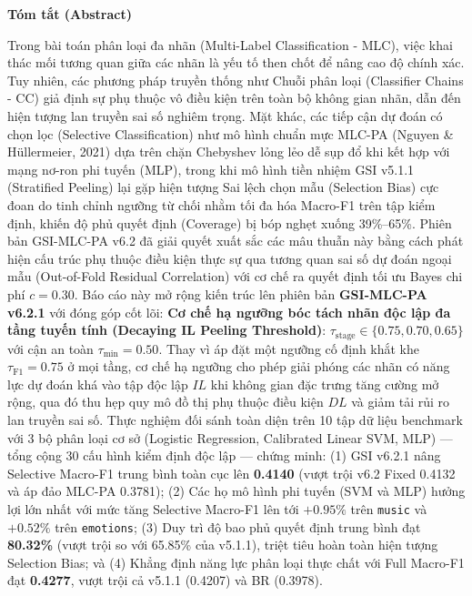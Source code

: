 \documentclass[10pt,a4paper,twoside]{article}
\begin{document}
\begin{center}\textbf{Tóm tắt (Abstract)}\end{center}
Trong bài toán phân loại đa nhãn (Multi-Label Classification - MLC), việc khai thác mối tương quan giữa các nhãn là yếu tố then chốt để nâng cao độ chính xác. Tuy nhiên, các phương pháp truyền thống như Chuỗi phân loại (Classifier Chains - CC) giả định sự phụ thuộc vô điều kiện trên toàn bộ không gian nhãn, dẫn đến hiện tượng lan truyền sai số nghiêm trọng. Mặt khác, các tiếp cận dự đoán có chọn lọc (Selective Classification) như mô hình chuẩn mực MLC-PA (Nguyen \& Hüllermeier, 2021) dựa trên chặn Chebyshev lỏng lẻo dễ sụp đổ khi kết hợp với mạng nơ-ron phi tuyến (MLP), trong khi mô hình tiền nhiệm GSI v5.1.1 (Stratified Peeling) lại gặp hiện tượng Sai lệch chọn mẫu (Selection Bias) cực đoan do tinh chỉnh ngưỡng từ chối nhằm tối đa hóa Macro-F1 trên tập kiểm định, khiến độ phủ quyết định (Coverage) bị bóp nghẹt xuống 39\%--65\%. Phiên bản GSI-MLC-PA v6.2 đã giải quyết xuất sắc các mâu thuẫn này bằng cách phát hiện cấu trúc phụ thuộc điều kiện thực sự qua tương quan sai số dự đoán ngoại mẫu (Out-of-Fold Residual Correlation) với cơ chế ra quyết định tối ưu Bayes chi phí $c = 0.30$. Báo cáo này mở rộng kiến trúc lên phiên bản \textbf{GSI-MLC-PA v6.2.1} với đóng góp cốt lõi: \textbf{Cơ chế hạ ngưỡng bóc tách nhãn độc lập đa tầng tuyến tính (Decaying IL Peeling Threshold)}: $\tau_{\text{stage}} \in \{0.75, 0.70, 0.65\}$ với cận an toàn $\tau_{\min} = 0.50$. Thay vì áp đặt một ngưỡng cố định khắt khe $\tau_{\text{F1}} = 0.75$ ở mọi tầng, cơ chế hạ ngưỡng cho phép giải phóng các nhãn có năng lực dự đoán khá vào tập độc lập $IL$ khi không gian đặc trưng tăng cường mở rộng, qua đó thu hẹp quy mô đồ thị phụ thuộc điều kiện $DL$ và giảm tải rủi ro lan truyền sai số. Thực nghiệm đối sánh toàn diện trên 10 tập dữ liệu benchmark với 3 bộ phân loại cơ sở (Logistic Regression, Calibrated Linear SVM, MLP) --- tổng cộng 30 cấu hình kiểm định độc lập --- chứng minh: (1) GSI v6.2.1 nâng Selective Macro-F1 trung bình toàn cục lên \textbf{0.4140} (vượt trội v6.2 Fixed 0.4132 và áp đảo MLC-PA 0.3781); (2) Các họ mô hình phi tuyến (SVM và MLP) hưởng lợi lớn nhất với mức tăng Selective Macro-F1 lên tới $+0.95\%$ trên \texttt{music} và $+0.52\%$ trên \texttt{emotions}; (3) Duy trì độ bao phủ quyết định trung bình đạt \textbf{80.32\%} (vượt trội so với 65.85\% của v5.1.1), triệt tiêu hoàn toàn hiện tượng Selection Bias; và (4) Khẳng định năng lực phân loại thực chất với Full Macro-F1 đạt \textbf{0.4277}, vượt trội cả v5.1.1 (0.4207) và BR (0.3978).
\end{document}
